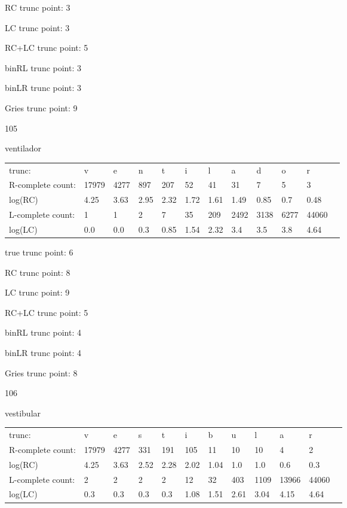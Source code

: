 \documentclass[10pt]{article}
\begin{document}
RC trunc point: 3

LC trunc point: 3

RC+LC trunc point: 5

binRL trunc point: 3

binLR trunc point: 3

Gries trunc point: 9

\newpage

105

ventilador

\begin{tabular}{l|lllllllllll}
trunc: & v & e & n & t & i & l & a & d & o & r & \\ 
R-complete count: & 17979 & 4277 & 897 & 207 & 52 & 41 & 31 & 7 & 5 & 3 & \\ 
log(RC) & 4.25 & 3.63 & 2.95 & 2.32 & 1.72 & 1.61 & 1.49 & 0.85 & 0.7 & 0.48 & \\ 
L-complete count: & 1 & 1 & 2 & 7 & 35 & 209 & 2492 & 3138 & 6277 & 44060 & \\ 
log(LC) & 0.0 & 0.0 & 0.3 & 0.85 & 1.54 & 2.32 & 3.4 & 3.5 & 3.8 & 4.64 & \\ 
\end{tabular}

true trunc point: 6

RC trunc point: 8

LC trunc point: 9

RC+LC trunc point: 5

binRL trunc point: 4

binLR trunc point: 4

Gries trunc point: 8

\vspace{1em}

106

vestibular

\begin{tabular}{l|lllllllllll}
trunc: & v & e & s & t & i & b & u & l & a & r & \\ 
R-complete count: & 17979 & 4277 & 331 & 191 & 105 & 11 & 10 & 10 & 4 & 2 & \\ 
log(RC) & 4.25 & 3.63 & 2.52 & 2.28 & 2.02 & 1.04 & 1.0 & 1.0 & 0.6 & 0.3 & \\ 
L-complete count: & 2 & 2 & 2 & 2 & 12 & 32 & 403 & 1109 & 13966 & 44060 & \\ 
log(LC) & 0.3 & 0.3 & 0.3 & 0.3 & 1.08 & 1.51 & 2.61 & 3.04 & 4.15 & 4.64 & \\ 
\end{tabular}
\end{document}
